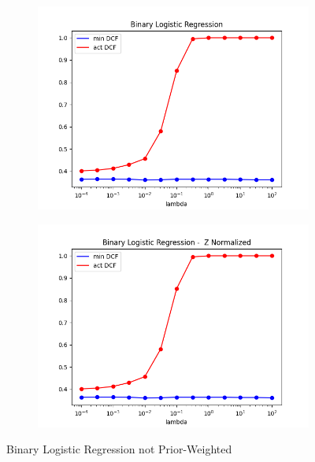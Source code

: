 \begin{figure}[h!]
\begin{subfigure}[b]{0.40\linewidth}
    \end{subfigure}
    \begin{subfigure}[b]{0.40\linewidth}
        \includegraphics[width=\linewidth]{Lab/08. Lab 08/Images/03. BLR - min And actDCF}
        \label{fig:BLRminAndactDCF}
    \end{subfigure}
    \begin{subfigure}[b]{0.40\linewidth}
        \includegraphics[width=\linewidth]{Lab/08. Lab 08/Images/04. BLR - minAnd actDCF - ZNormalized}
        \label{fig:BLRminAndactDCFZNorm}
    \end{subfigure}
    \caption{Binary Logistic Regression not Prior-Weighted}
    \label{fig:BLR}
\end{figure}

